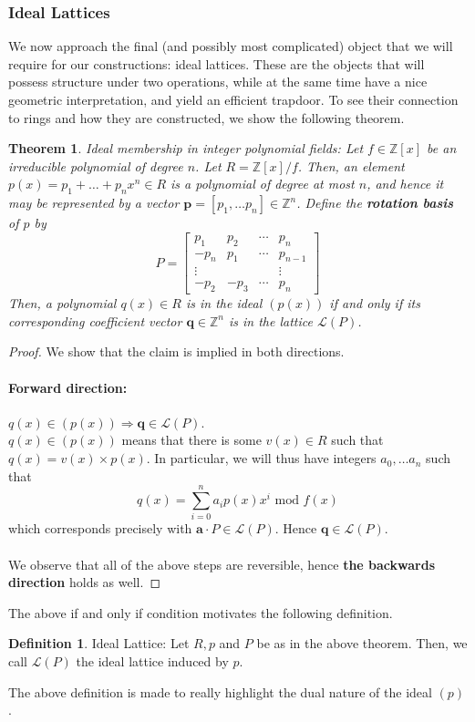 \documentclass{article}
\newtheorem{theorem}{Theorem}[section]
\theoremstyle{definition}
\newtheorem{definition}{Definition}[section]
\theoremstyle{example}
\renewcommand{\L}{\mathcal{L}}
\newcommand{\Int}{\mathbb{Z}}
\renewcommand{\mod}{\,\,\text{mod}\,\,}
\renewcommand{\vec}[1]{\mathbf{#1}}
\begin{document}
\subsubsection{Ideal Lattices}
\label{sec:ideal_lattices}
We now approach the final (and possibly most complicated) object that we will
require for our constructions: ideal lattices. These are the objects that will
possess structure under two operations, while at the same time have a nice
geometric interpretation, and yield an efficient trapdoor. To see their
connection to rings and how they are constructed, we show the following theorem.
\begin{theorem}{Ideal membership in integer polynomial fields:}
 Let $f \in \Int[x]$ be an irreducible polynomial of degree $n$. Let $R = \Int[x]/f$. Then, an
 element $p(x) = p_1 + \hdots + p_nx^n\in R$ is a polynomial of degree at most $n$, and hence it may be
 represented by a vector $\vec{p} = [p_1, \hdots p_n] \in \Int^n$. Define the \textbf{rotation
   basis} of $p$ by
 \[
   P =
   \begin{bmatrix}
     p_1 & p_2 & \cdots & p_n \\
     -p_n & p_1 & \cdots & p_{n - 1} \\
     \vdots & & & \vdots \\
     -p_2 & -p_3 & \cdots & p_n
   \end{bmatrix}
 \]
 Then, a polynomial $q(x) \in R$ is in the ideal $(p(x))$ if and only if its
 corresponding coefficient vector $\vec{q} \in \Int^n$ is in the lattice $\L(P)$. 
\end{theorem}
\begin{proof}
  We show that the claim is implied in both directions.
  \paragraph{Forward direction:} $q(x) \in (p(x)) \Rightarrow \vec{q} \in \L(P)$.\\
  $q(x) \in (p(x))$ means that there is some $v(x) \in R$ such that $q(x) = v(x)
  \times p(x)$. In particular, we will thus have integers $a_0, \hdots a_n$ such that
  \[
    q(x) = \sum_{i = 0}^n a_ip(x)x^i \mod f(x)
  \] which corresponds precisely with
  $\vec{a} \cdot P \in \L(P)$. Hence $\vec{q} \in \L(P)$.
\paragraph{} We observe that all of the above steps are reversible, hence \textbf{the
backwards direction} holds as well.
\end{proof}
The above if and only if condition motivates the following definition.
\begin{definition}{Ideal Lattice:}
  Let $R, p$ and $P$ be as in the above theorem. Then, we call $\L(P)$ the ideal
  lattice induced by $p$.
\end{definition}
The above definition is made to really highlight the dual nature of the ideal $(p)$.
\end{document}
